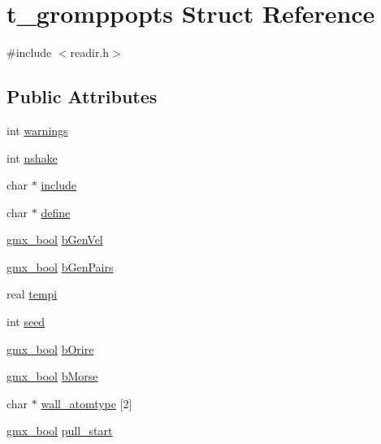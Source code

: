 \hypertarget{structt__gromppopts}{\section{t\-\_\-gromppopts \-Struct \-Reference}
\label{structt__gromppopts}
}


{\ttfamily \#include $<$readir.\-h$>$}

\subsection*{\-Public \-Attributes}
\begin{DoxyCompactItemize}
\item 
int \hyperlink{structt__gromppopts_a54b3383660449ab9f95cbefc0e38d99c}{warnings}
\item 
int \hyperlink{structt__gromppopts_a6cc45a1f8eef9fa02e54f9a1339eff14}{nshake}
\item 
char $\ast$ \hyperlink{structt__gromppopts_a8cb084b1f6c469954acc5aa7f83e607f}{include}
\item 
char $\ast$ \hyperlink{structt__gromppopts_a34b485c5356b4e6fe1f6f5e1cfc96727}{define}
\item 
\hyperlink{include_2types_2simple_8h_a8fddad319f226e856400d190198d5151}{gmx\-\_\-bool} \hyperlink{structt__gromppopts_a2a7e88745fc30ae9659b267cbe88e08e}{b\-Gen\-Vel}
\item 
\hyperlink{include_2types_2simple_8h_a8fddad319f226e856400d190198d5151}{gmx\-\_\-bool} \hyperlink{structt__gromppopts_ac760b721b0dc4fc9f90ad34e8ff05552}{b\-Gen\-Pairs}
\item 
real \hyperlink{structt__gromppopts_ace58a5841ac7594b7f17acb601af503f}{tempi}
\item 
int \hyperlink{structt__gromppopts_a3be0f1de71dc5672ee69b97d8b0f4498}{seed}
\item 
\hyperlink{include_2types_2simple_8h_a8fddad319f226e856400d190198d5151}{gmx\-\_\-bool} \hyperlink{structt__gromppopts_a05107a89dc12f056f0d051e07ea7de75}{b\-Orire}
\item 
\hyperlink{include_2types_2simple_8h_a8fddad319f226e856400d190198d5151}{gmx\-\_\-bool} \hyperlink{structt__gromppopts_aec596feaf104fbe032723a6d9019aa80}{b\-Morse}
\item 
char $\ast$ \hyperlink{structt__gromppopts_a23739cc8aa56ec9a2a6fa8a35113db9c}{wall\-\_\-atomtype} \mbox{[}2\mbox{]}
\item 
\hyperlink{include_2types_2simple_8h_a8fddad319f226e856400d190198d5151}{gmx\-\_\-bool} \hyperlink{structt__gromppopts_a7bfc11bb6756f7ab62c5205a67ddf44e}{pull\-\_\-start}

\end{DoxyCompactItemize}
